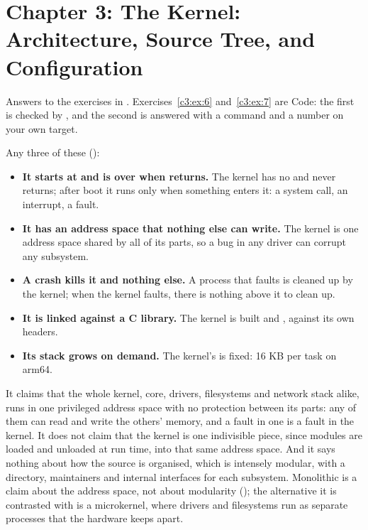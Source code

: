 
\section{Chapter 3: The Kernel: Architecture, Source Tree, and Configuration}
\label{sol:sec:c3}
Answers to the exercises in . Exercises~\ref{c3:ex:6} and~\ref{c3:ex:7}
are Code: the first is checked by , and the second is answered with a command
and a number on your own target.


 Any three of these ():
\begin{itemize}
  \item \textbf{It starts at  and is over when  returns.} The kernel has no
     and never returns; after boot it runs only when something enters it: a system call,
    an interrupt, a fault.
  \item \textbf{It has an address space that nothing else can write.} The kernel is one address
    space shared by all of its parts, so a bug in any driver can corrupt any subsystem.
  \item \textbf{A crash kills it and nothing else.} A process that faults is cleaned up by the
    kernel; when the kernel faults, there is nothing above it to clean up.
  \item \textbf{It is linked against a C library.} The kernel is built  and
    , against its own headers.
  \item \textbf{Its stack grows on demand.} The kernel's is fixed: 16 KB per task on arm64.
\end{itemize}

 It claims that the whole kernel, core, drivers, filesystems and network stack alike, runs
in one privileged address space with no protection between its parts: any of them can read and
write the others' memory, and a fault in one is a fault in the kernel. It does not claim that the
kernel is one indivisible piece, since modules are loaded and unloaded at run time, into that same
address space. And it says nothing about how the source is organised, which is intensely modular,
with a directory, maintainers and internal interfaces for each subsystem. Monolithic is a claim
about the address space, not about modularity (); the alternative it is contrasted
with is a microkernel, where drivers and filesystems run as separate processes that the hardware
keeps apart.

